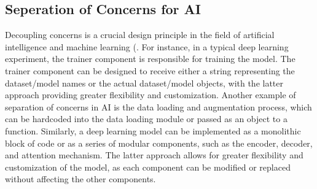 \subsection{Seperation of Concerns for AI}


Decoupling concerns is a crucial design principle in the field of artificial intelligence and machine learning (\cite{mo2016decoupling,qian2006decoupling, pressman2010software}. For instance, in a typical deep learning experiment, the trainer component is responsible for training the model. The trainer component can be designed to receive either a string representing the dataset/model names or the actual dataset/model objects, with the latter approach providing greater flexibility and customization. Another example of separation of concerns in AI is the data loading and augmentation process, which can be hardcoded into the data loading module or passed as an object to a function. Similarly, a deep learning model can be implemented as a monolithic block of code or as a series of modular components, such as the encoder, decoder, and attention mechanism. The latter approach allows for greater flexibility and customization of the model, as each component can be modified or replaced without affecting the other components.







